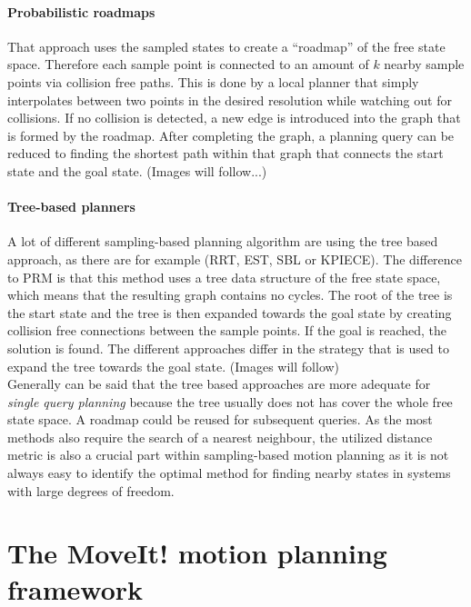 \paragraph{Probabilistic roadmaps}

That approach uses the sampled states to create a ``roadmap'' of the free state space. Therefore each sample point is connected to an amount of $k$ nearby sample points via collision free paths. This is done by a local planner that simply interpolates between two points in the desired resolution while watching out for collisions. If no collision is detected, a new edge is introduced into the graph that is formed by the roadmap. After completing the graph, a planning query can be reduced to finding the shortest path within that graph that connects the start state and the goal state. (Images will follow...)

\paragraph{Tree-based planners}

A lot of different sampling-based planning algorithm are using the tree based approach, as there are for example (RRT, EST, SBL or KPIECE). The difference to PRM is that this method uses a tree data structure of the free state space, which means that the resulting graph contains no cycles. The root of the tree is the start state and the tree is then expanded towards the goal state by creating collision free connections between the sample points. If the goal is reached, the solution is found. The different approaches differ in the strategy that is used to expand the tree towards the goal state. (Images will follow)\\

Generally can be said that the tree based approaches are more adequate for \emph{single query planning} because the tree usually does not has cover the whole free state space. A roadmap could be reused for subsequent queries. As the most methods also require the search of a nearest neighbour, the utilized distance metric is also a crucial part within sampling-based motion planning as it is not always easy to identify the optimal method for finding nearby states in systems with large degrees of freedom.  

\section{The MoveIt! motion planning framework}

